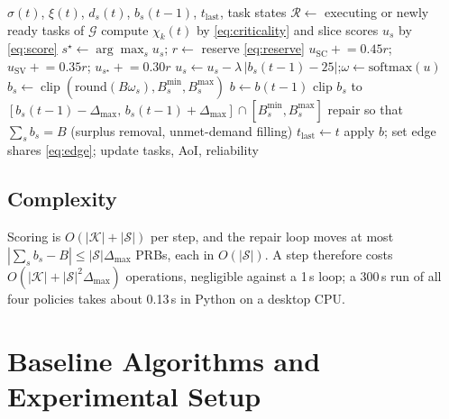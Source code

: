 \documentclass[conference]{IEEEtran}
\DeclareMathOperator{\clip}{clip}
\begin{document}
\begin{algorithm}[t]
\caption{One MARS control step at time $t$}
\label{alg:mars}
\small
\begin{algorithmic}[1]
\Require $\sigma(t)$, $\xi(t)$, $d_s(t)$, $b_s(t-1)$, $t_{\mathrm{last}}$, task states
\State $\mathcal{R}\gets$ executing or newly ready tasks of $\mathcal{G}$
\State compute $\chi_k(t)$ by \eqref{eq:criticality} and slice scores $u_s$ by \eqref{eq:score}
\State $s^\star\gets\arg\max_s u_s$;\; $r\gets$ reserve \eqref{eq:reserve}
\State $u_{\mathrm{SC}}\mathrel{+}=0.45r$;\; $u_{\mathrm{SV}}\mathrel{+}=0.35r$;\; $u_{s^\star}\mathrel{+}=0.30r$
\State $u_s\gets u_s-\lambda\,|b_s(t-1)-25|$;\quad $\omega\gets\mathrm{softmax}(u)$
\State $b_s\gets\clip(\mathrm{round}(B\omega_s),B_s^{\min},B_s^{\max})$
 \State $b\gets b(t-1)$ 
\Else \State clip $b_s$ to $[b_s(t-1)-\Delta_{\max},\,b_s(t-1)+\Delta_{\max}]\cap[B_s^{\min},B_s^{\max}]$
\EndIf
\State repair so that $\sum_s b_s=B$ (surplus removal, unmet-demand filling)
 $t_{\mathrm{last}}\gets t$ \EndIf
\State apply $b$; set edge shares \eqref{eq:edge}; update tasks, AoI, reliability
\end{algorithmic}
\end{algorithm}

\subsection{Complexity}
Scoring is $O(|\mathcal{K}|+|\mathcal{S}|)$ per step, and the repair loop moves at most $|\sum_s b_s-B|\le|\mathcal{S}|\Delta_{\max}$ PRBs, each in $O(|\mathcal{S}|)$. A step therefore costs $O(|\mathcal{K}|+|\mathcal{S}|^2\Delta_{\max})$ operations, negligible against a 1\,s loop; a 300\,s run of all four policies takes about 0.13\,s in Python on a desktop CPU.

\section{Baseline Algorithms and Experimental Setup}\label{sec:setup}
\end{document}
